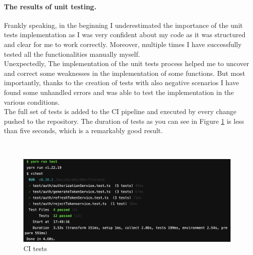 \paragraph*{The results of unit testing.} Frankly speaking, in the beginning I underestimated the importance of the unit tests implementation as I was very confident about my code as it was structured and clear for me to work correctly. Moreover, multiple times I have successfully tested all the functionalities manually myself.\\
Unexpectedly, The implementation of the unit tests process helped me to uncover and correct some weaknesses in the implementation of some functions. But most importantly, thanks to the creation of tests with also negative scenarios I have found some unhandled errors and was able to test the implementation in the various conditions.\\
The full set of tests is added to the CI pipeline and executed by every change pushed to the repository. The duration of tests as you can see in Figure \ref{img:test} is less than five seconds, which is a remarkably good result.

 \

\begin{figure}[h]
\centering
\includegraphics[scale=0.47]{../png/tests.png}
\caption{CI tests}\label{picture:tests}
\label{img:test}
\end{figure}

